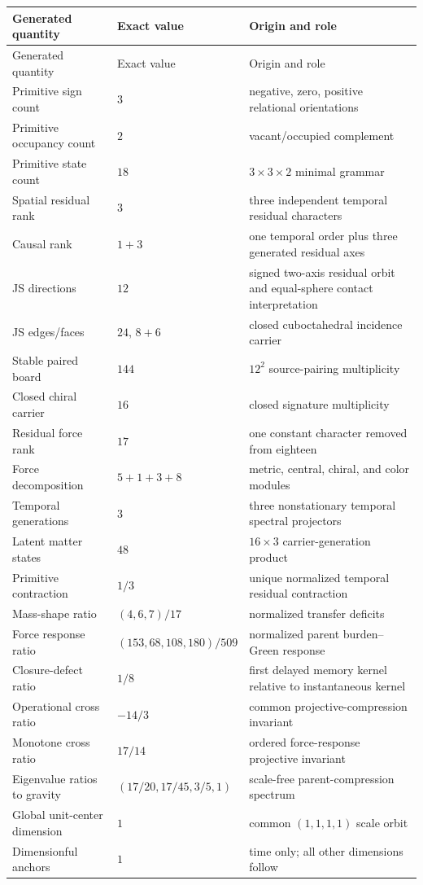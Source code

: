 \documentclass[11pt]{article}
\numberwithin{equation}{section}
\theoremstyle{remark}
\begin{document}
\begin{longtable}{p{3.15cm}p{4.0cm}p{7.35cm}}
\toprule Generated quantity & Exact value & Origin and role\\ \midrule
\endfirsthead\toprule Generated quantity & Exact value & Origin and role\\ \midrule\endhead
Primitive sign count&$3$&negative, zero, positive relational orientations\\
Primitive occupancy count&$2$&vacant/occupied complement\\
Primitive state count&$18$&$3\times3\times2$ minimal grammar\\
Spatial residual rank&$3$&three independent temporal residual characters\\
Causal rank&$1+3$&one temporal order plus three generated residual axes\\
JS directions&$12$&signed two-axis residual orbit and equal-sphere contact interpretation\\
JS edges/faces&$24$, $8+6$&closed cuboctahedral incidence carrier\\
Stable paired board&$144$&$12^2$ source-pairing multiplicity\\
Closed chiral carrier&$16$&closed signature multiplicity\\
Residual force rank&$17$&one constant character removed from eighteen\\
Force decomposition&$5+1+3+8$&metric, central, chiral, and color modules\\
Temporal generations&$3$&three nonstationary temporal spectral projectors\\
Latent matter states&$48$&$16\times3$ carrier-generation product\\
Primitive contraction&$1/3$&unique normalized temporal residual contraction\\
Mass-shape ratio&$(4,6,7)/17$&normalized transfer deficits\\
Force response ratio&$(153,68,108,180)/509$&normalized parent burden--Green response\\
Closure-defect ratio&$1/8$&first delayed memory kernel relative to instantaneous kernel\\
Operational cross ratio&$-14/3$&common projective-compression invariant\\
Monotone cross ratio&$17/14$&ordered force-response projective invariant\\
Eigenvalue ratios to gravity&$(17/20,17/45,3/5,1)$&scale-free parent-compression spectrum\\
Global unit-center dimension&$1$&common $(1,1,1,1)$ scale orbit\\
Dimensionful anchors&$1$&time only; all other dimensions follow\\
\bottomrule
\end{longtable}
\end{document}

